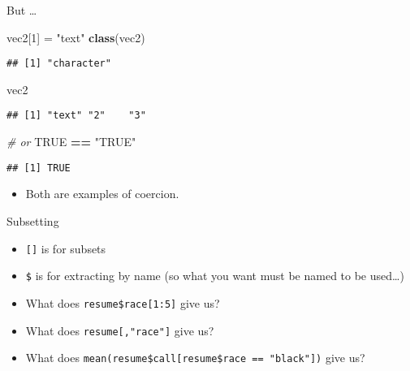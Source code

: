 \documentclass[ignorenonframetext,]{beamer}
\newenvironment{Shaded}{\begin{snugshade}}{\end{snugshade}}
\newcommand{\KeywordTok}[1]{\textcolor[rgb]{0.13,0.29,0.53}{\textbf{#1}}}
\newcommand{\DecValTok}[1]{\textcolor[rgb]{0.00,0.00,0.81}{#1}}
\newcommand{\StringTok}[1]{\textcolor[rgb]{0.31,0.60,0.02}{#1}}
\newcommand{\CommentTok}[1]{\textcolor[rgb]{0.56,0.35,0.01}{\textit{#1}}}
\newcommand{\OtherTok}[1]{\textcolor[rgb]{0.56,0.35,0.01}{#1}}
\newcommand{\OperatorTok}[1]{\textcolor[rgb]{0.81,0.36,0.00}{\textbf{#1}}}
\newcommand{\NormalTok}[1]{#1}
\providecommand{\tightlist}{%
	\setlength{\itemsep}{0pt}\setlength{\parskip}{0pt}}
\begin{document}
\begin{frame}[fragile]{But \ldots{}}

\begin{Shaded}
\begin{Highlighting}[]
\NormalTok{vec2[}\DecValTok{1}\NormalTok{] =}\StringTok{ "text"}
\KeywordTok{class}\NormalTok{(vec2)}
\end{Highlighting}
\end{Shaded}

\begin{verbatim}
## [1] "character"
\end{verbatim}

\begin{Shaded}
\begin{Highlighting}[]
\NormalTok{vec2}
\end{Highlighting}
\end{Shaded}

\begin{verbatim}
## [1] "text" "2"    "3"
\end{verbatim}

\begin{Shaded}
\begin{Highlighting}[]
\CommentTok{# or}
\OtherTok{TRUE} \OperatorTok{==}\StringTok{ "TRUE"}
\end{Highlighting}
\end{Shaded}

\begin{verbatim}
## [1] TRUE
\end{verbatim}

\begin{itemize}
\tightlist
\item
  Both are examples of coercion.
\end{itemize}

\end{frame}

\begin{frame}[fragile]{Subsetting}

\begin{itemize}
\tightlist
\item
  \texttt{{[}{]}} is for subsets
\item
  \texttt{\$} is for extracting by name (so what you want must be named
  to be used\ldots{})
\item
  What does \texttt{resume\$race{[}1:5{]}} give us?
\item
  What does \texttt{resume{[},"race"{]}} give us?
\item
  What does \texttt{mean(resume\$call{[}resume\$race\ ==\ "black"{]})}
  give us?
\end{itemize}

\end{frame}
\end{document}
